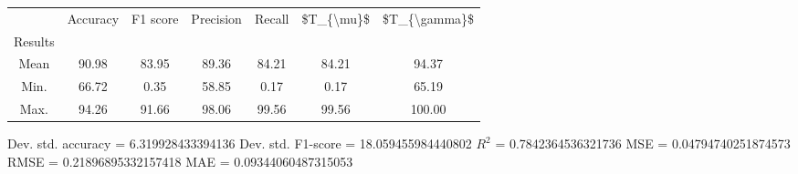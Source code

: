 \begin{tabular}{|c|c|c|c|c|c|c|}
\toprule
{} &  Accuracy &  F1 score &  Precision &  Recall &  \$T\_\{\textbackslash mu\}\$ &  \$T\_\{\textbackslash gamma\}\$ \\
Results &           &           &            &         &            &               \\
\hline
Mean    &     90.98 &     83.95 &      89.36 &   84.21 &      84.21 &         94.37 \\
Min.    &     66.72 &      0.35 &      58.85 &    0.17 &       0.17 &         65.19 \\
Max.    &     94.26 &     91.66 &      98.06 &   99.56 &      99.56 &        100.00 \\
\bottomrule
\end{tabular}

 Dev. std. accuracy = 6.319928433394136
 Dev. std. F1-score = 18.059455984440802
 $R^2$ = 0.7842364536321736
 MSE = 0.04794740251874573
 RMSE = 0.21896895332157418
 MAE = 0.09344060487315053